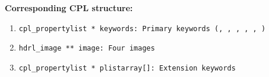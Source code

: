 \begin{datastructdef}
\textbf{Corresponding \ac{CPL} structure:}
\begin{enumerate}
    \item \texttt{cpl\_propertylist * keywords: Primary keywords (\hyperref[fits:dpr.catg]{},  \hyperref[fits:dpr.tech]{},  \hyperref[fits:dpr.type]{},  \hyperref[fits:ins.opti3.name]{},  \hyperref[fits:ins.opti9.name]{},  \hyperref[fits:ins.opti10.name]{})}
    \item \texttt{hdrl\_image ** image: Four images}
    \item \texttt{cpl\_propertylist * plistarray[]: Extension keywords}
\end{enumerate}
\end{datastructdef}


